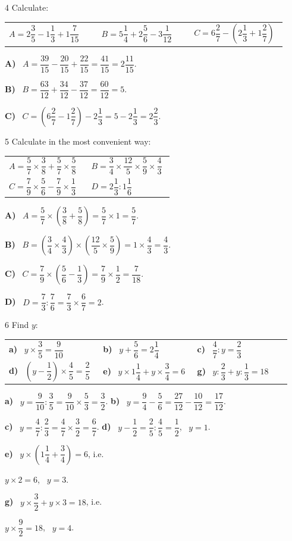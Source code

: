 \documentclass[11pt]{article}
\makeatletter
\newif\ifsol \solfalse
\renewcommand{\arraystretch}{1.35}
\newcommand{\probsol}[1]{%
  \begin{lrbox}{\solmeasure}\begin{minipage}{\dimexpr\linewidth-24pt\relax}#1\end{minipage}\end{lrbox}%
  \ifsol
    \begin{solbox}#1\end{solbox}%
  \else
    \setlength{\solht}{\dimexpr\ht\solmeasure+\dp\solmeasure+0.85cm\relax}%
    \ifdim\solht<1.35cm\setlength{\solht}{1.35cm}\fi
    \begin{tcolorbox}[colback=white,colframe=Line,boxrule=0.8pt,arc=5pt,
      left=8pt,right=8pt,top=4pt,bottom=4pt,height=\solht]{\footnotesize\color{Slate}\itshape\WorkWord}\end{tcolorbox}%
  \fi}
\newcommand{\pa}[1]{\textbf{#1)}\ }
\newenvironment{cols2}{\par\vspace{3pt}\noindent\setlength{\tabcolsep}{0pt}\renewcommand{\arraystretch}{1.3}%
  \begin{tabular}{@{}>{\raggedright\arraybackslash\rule{0pt}{4.4ex}}p{0.48\linewidth}<{\rule[-2.3ex]{0pt}{0pt}}@{\hspace{0.03\linewidth}}>{\raggedright\arraybackslash\rule{0pt}{4.4ex}}p{0.48\linewidth}<{\rule[-2.3ex]{0pt}{0pt}}@{}}}%
  {\end{tabular}\par}
\newenvironment{cols3}{\par\vspace{3pt}\noindent\setlength{\tabcolsep}{0pt}\renewcommand{\arraystretch}{1.3}%
  \begin{tabular}{@{}>{\raggedright\arraybackslash\rule{0pt}{4.4ex}}p{0.32\linewidth}<{\rule[-2.3ex]{0pt}{0pt}}@{\hspace{0.015\linewidth}}>{\raggedright\arraybackslash\rule{0pt}{4.4ex}}p{0.32\linewidth}<{\rule[-2.3ex]{0pt}{0pt}}@{\hspace{0.015\linewidth}}>{\raggedright\arraybackslash\rule{0pt}{4.4ex}}p{0.32\linewidth}<{\rule[-2.3ex]{0pt}{0pt}}@{}}}%
  {\end{tabular}\par}
\newcommand{\gap}{\vspace{0.3cm}}
\def\WorkWord{Your work:}
\makeatother
\begin{document}
\gap
\begin{probbox}{4}{\relax}
Calculate:
\begin{cols3}
$A=2\dfrac35-1\dfrac13+1\dfrac7{15}$ & $B=5\dfrac14+2\dfrac56-3\dfrac1{12}$ & $C=6\dfrac27-\left(2\dfrac13+1\dfrac27\right)$
\end{cols3}
\end{probbox}
\probsol{
\pa{A} $A=\dfrac{39}{15}-\dfrac{20}{15}+\dfrac{22}{15}=\dfrac{41}{15}=2\dfrac{11}{15}$.\par
\pa{B} $B=\dfrac{63}{12}+\dfrac{34}{12}-\dfrac{37}{12}=\dfrac{60}{12}=5$.\par
\pa{C} $C=\left(6\dfrac27-1\dfrac27\right)-2\dfrac13=5-2\dfrac13=2\dfrac23$.
}
\gap
\begin{probbox}{5}{\relax}
Calculate in the most convenient way:
\begin{cols2}
$A=\dfrac57\times\dfrac38+\dfrac57\times\dfrac58$ & $B=\dfrac34\times\dfrac{12}5\times\dfrac59\times\dfrac43$\\
$C=\dfrac79\times\dfrac56-\dfrac79\times\dfrac13$ & $D=2\dfrac13:1\dfrac16$
\end{cols2}
\end{probbox}
\probsol{
\pa{A} $A=\dfrac57\times\left(\dfrac38+\dfrac58\right)=\dfrac57\times1=\dfrac57$.\par
\pa{B} $B=\left(\dfrac34\times\dfrac43\right)\times\left(\dfrac{12}5\times\dfrac59\right)=1\times\dfrac43=\dfrac43$.\par
\pa{C} $C=\dfrac79\times\left(\dfrac56-\dfrac13\right)=\dfrac79\times\dfrac12=\dfrac7{18}$.\par
\pa{D} $D=\dfrac73:\dfrac76=\dfrac73\times\dfrac67=2$.
}
\gap
\begin{probbox}{6}{\relax}
Find $y$:
\begin{cols3}
\pa{a} $y\times\dfrac35=\dfrac9{10}$ & \pa{b} $y+\dfrac56=2\dfrac14$ & \pa{c} $\dfrac47:y=\dfrac23$\\
\pa{d} $\left(y-\dfrac12\right)\times\dfrac45=\dfrac25$ & \pa{e} $y\times1\dfrac14+y\times\dfrac34=6$ & \pa{g} $y:\dfrac23+y:\dfrac13=18$
\end{cols3}
\end{probbox}
\probsol{
\pa{a} $y=\dfrac9{10}:\dfrac35=\dfrac9{10}\times\dfrac53=\dfrac32$. \qquad \pa{b} $y=\dfrac94-\dfrac56=\dfrac{27}{12}-\dfrac{10}{12}=\dfrac{17}{12}$.\par
\pa{c} $y=\dfrac47:\dfrac23=\dfrac47\times\dfrac32=\dfrac67$. \qquad \pa{d} $y-\dfrac12=\dfrac25:\dfrac45=\dfrac12$, \ $y=1$.\par
\pa{e} $y\times\left(1\dfrac14+\dfrac34\right)=6$, i.e.\par $y\times2=6$, \ $y=3$.\par
\pa{g} $y\times\dfrac32+y\times3=18$, i.e.\par $y\times\dfrac92=18$, \ $y=4$.
}
\end{document}
